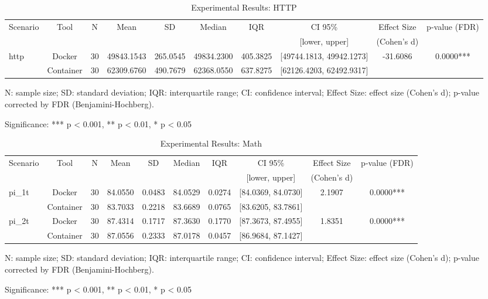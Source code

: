 \documentclass{article}
\begin{document}
\begin{table}[h]
\centering
\small
\caption{Experimental Results: HTTP}
\label{tab:http}
\begin{tabular}{lccccccccc}
\toprule
Scenario & Tool & N & Mean & SD & Median & IQR & CI 95\% & Effect Size & p-value (FDR) \\
 & & & & & & & [lower, upper] & (Cohen's d) & \\
\midrule
\multirow{2}{*}{http} & Docker & 30 & 49843.1543 & 265.0545 & 49834.2300 & 405.3825 & [49744.1813, 49942.1273] & -31.6086 & 0.0000*** \\
 & Container & 30 & 62309.6760 & 490.7679 & 62368.0550 & 637.8275 & [62126.4203, 62492.9317] &  &  \\
\midrule
\bottomrule
\end{tabular}
\begin{tablenotes}
\small
\item N: sample size; SD: standard deviation; IQR: interquartile range; CI: confidence interval; Effect Size: effect size (Cohen's d); p-value corrected by FDR (Benjamini-Hochberg).
\item Significance: *** p < 0.001, ** p < 0.01, * p < 0.05
\end{tablenotes}
\end{table}


\begin{table}[h]
\centering
\small
\caption{Experimental Results: Math}
\label{tab:math}
\begin{tabular}{lccccccccc}
\toprule
Scenario & Tool & N & Mean & SD & Median & IQR & CI 95\% & Effect Size & p-value (FDR) \\
 & & & & & & & [lower, upper] & (Cohen's d) & \\
\midrule
\multirow{2}{*}{pi\_1t} & Docker & 30 & 84.0550 & 0.0483 & 84.0529 & 0.0274 & [84.0369, 84.0730] & 2.1907 & 0.0000*** \\
 & Container & 30 & 83.7033 & 0.2218 & 83.6689 & 0.0765 & [83.6205, 83.7861] &  &  \\
\midrule
\multirow{2}{*}{pi\_2t} & Docker & 30 & 87.4314 & 0.1717 & 87.3630 & 0.1770 & [87.3673, 87.4955] & 1.8351 & 0.0000*** \\
 & Container & 30 & 87.0556 & 0.2333 & 87.0178 & 0.0457 & [86.9684, 87.1427] &  &  \\
\midrule
\bottomrule
\end{tabular}
\begin{tablenotes}
\small
\item N: sample size; SD: standard deviation; IQR: interquartile range; CI: confidence interval; Effect Size: effect size (Cohen's d); p-value corrected by FDR (Benjamini-Hochberg).
\item Significance: *** p < 0.001, ** p < 0.01, * p < 0.05
\end{tablenotes}
\end{table}
\end{document}
